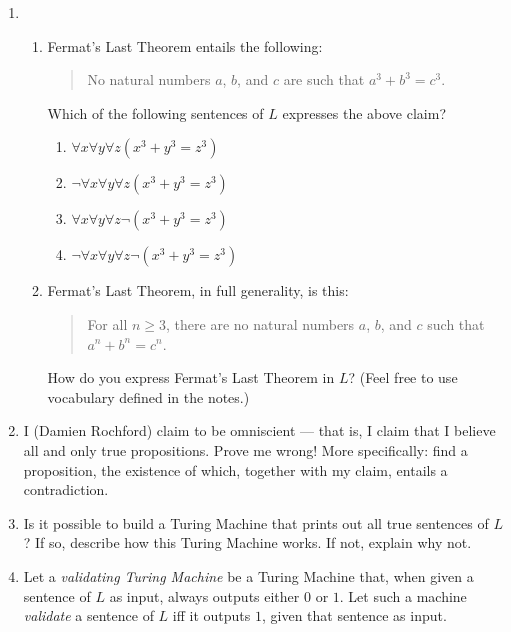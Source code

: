 \documentclass[12pt,a4paper]{article}
\begin{document}
\begin{enumerate}

\item \begin{enumerate}
	\item Fermat's Last Theorem entails the following:
		\begin{quote}
		No natural numbers $a$, $b$, and $c$ are such that $a^3 + b^3 = c^3$.
		\end{quote}

	Which of the following sentences of $L$ expresses the above claim?
		\begin{enumerate}
		\item $\forall x\forall y\forall z (x^3+ y^3  =  z^3)$
    		\item $\neg \forall x\forall y \forall z (x^3 + y^3 =  z^3)$
    		\item $\forall x\forall y \forall z \neg(x^3 + y^3 =  z^3)$
		\item $\neg \forall x\forall y \forall z \neg(x^3 + y^3 =  z^3)$
		\end{enumerate}
	\item Fermat's Last Theorem, in full generality, is this:
		\begin{quote}
		For all $n\ge 3$, there are no natural numbers $a$, $b$, and $c$ such that $a^n + b^n = c^n$.
		\end{quote}
	How do you express Fermat's Last Theorem in $L$? (Feel free to use vocabulary defined in the notes.)
	\end{enumerate}
	
\item I (Damien Rochford) claim to be omniscient --- that is, I claim that I believe all and only true propositions. Prove me wrong! More specifically: find a proposition, the existence of which, together with my claim, entails a contradiction.

\item Is it possible to build a Turing Machine that prints out all true sentences of $L$? If so, describe how this Turing Machine works. If not, explain why not.

\item Let a \textsl{validating Turing Machine} be a Turing Machine that, when given a sentence of $L$ as input, always outputs either $0$ or $1$. Let such a machine \textsl{validate} a sentence of $L$ iff it outputs $1$, given that sentence as input.


\end{enumerate}
\end{document}
